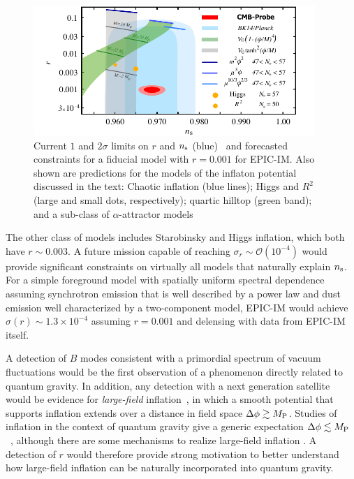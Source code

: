 \begin{figure}[ht!]
\parbox{4.in}{\centerline {
\includegraphics[width=4.2in]{figs/nsrlabeledrp001v2} } }
\hspace{-0.05in}
\parbox{2.5in}{
\caption{ \small \setlength{\baselineskip}{0.95\baselineskip}
Current $1$ and $2\sigma $ limits on $r$ and $n_{\rm s}$ (blue)~\cite{Array:2015xqh} and forecasted constraints for a fiducial model with $r=0.001$ for 
EPIC-IM. Also shown are predictions for the models of the inflaton potential discussed in the text: Chaotic inflation (blue lines); 
Higgs and $R^2$ (large and small dots, respectively);  quartic hilltop (green band); and a sub-class of $\alpha$-attractor
models~\cite{Kallosh:2013hoa}
\label{fig:nsrp001} } }
\end{figure}

The other class of models includes Starobinsky and Higgs inflation, which both have $r\sim0.003$. A future mission 
capable of reaching $\sigma_r\sim\mathcal{O}(10^{-4})$ would provide significant constraints on virtually all models that naturally explain $n_{\rm s}$. For a simple foreground model with spatially uniform spectral dependence assuming synchrotron emission that is well described by a power law and dust emission well characterized by a two-component model, EPIC-IM would achieve $\sigma(r)\sim1.3 \times 10^{-4}$ assuming $r=0.001$ and delensing with data from EPIC-IM itself. 

A detection of $B$ modes consistent with a primordial spectrum of vacuum fluctuations would be the first observation 
of a phenomenon directly related to quantum gravity. In addition, any detection with a next generation satellite would be 
evidence for {\it large-field} inflation~\cite{Lyth:1996im}, in which a smooth potential that supports inflation extends over 
a distance in field space $\Delta\phi \gtrsim M_{\rm P}$. Studies of inflation in the context of quantum gravity give a generic 
expectation $\Delta\phi \lesssim M_{\rm P}$~\cite{Banks:2003sx,Baumann:2014nda,Brown:2015iha,Rudelius:2015xta}, although 
there are some mechanisms to realize large-field inflation \cite{Silverstein:2008sg,Kaloper:2008fb,Marchesano:2014mla,Blumenhagen:2015xpa}. 
A detection of $r$ would therefore provide strong 
motivation to better understand how large-field inflation can be naturally incorporated into quantum gravity. 

